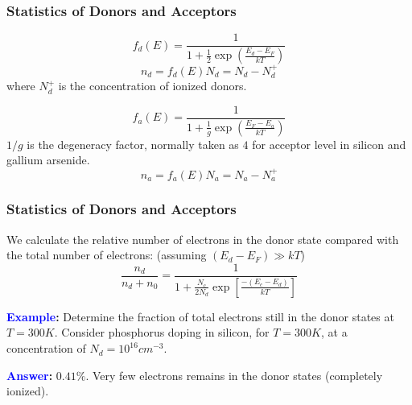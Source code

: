 \documentclass{beamer}
\begin{document}
    \begin{frame} \frametitle{Statistics of Donors and Acceptors}
        \begin{equation*}
            f_d(E) = \frac{1}{1 + \frac{1}{2} \exp \left( \frac{E_d - E_F}{kT}  \right)} 
        \end{equation*}
        \begin{equation*}
            n_d = f_d(E) N_d = N_d - N_d^+
        \end{equation*}
        where $N_d^+$ is the concentration of ionized donors.

        \begin{equation*}
            f_a(E) = \frac{1}{1 + \frac{1}{g} \exp\left( \frac{E_F - E_a}{kT}  \right)} 
        \end{equation*}
        $1/g$ is the degeneracy factor, normally taken as $4$ for acceptor level in silicon and gallium arsenide.
        \begin{equation*}
            n_a = f_a(E) N_a = N_a - N_a^+
        \end{equation*}
    \end{frame}


    \begin{frame} \frametitle{Statistics of Donors and Acceptors}
        \par We calculate the relative number of electrons in the donor state compared with the total number of electrons: (assuming $(E_d - E_F) \gg  kT$)
        \begin{equation*}
            \frac{n_d}{n_d + n_0} = \frac{1}{1 + \frac{N_c}{2N_d} \exp\left[ \frac{-(E_c - E_d)}{kT}  \right]} 
        \end{equation*}

        \par \textbf{\textcolor{blue}{Example}:} Determine the fraction of total electrons still in the donor states at $T = 300 K$. Consider phosphorus doping in silicon, for $T = 300 K$, at a concentration of $N_d = 10^{16} cm^{-3}$.
        \par \textbf{\textcolor{blue}{Answer}:} $0.41\%$. Very few electrons remains in the donor states (completely ionized).
    \end{frame}
\end{document}

